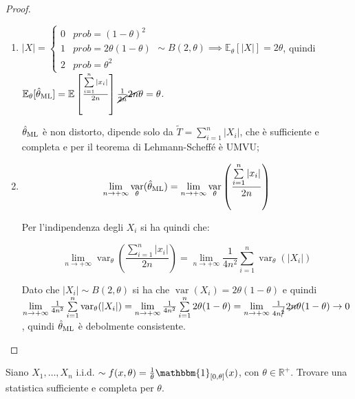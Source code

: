 \documentclass[hidelinks, 10pt]{report}
\DeclareMathOperator{\var}{var}
\begin{document}
\begin{proof}
\begin{enumerate}
Impostato uguale a zero, si ha che $ \ML{\theta} = \frac{\sum\limits_{i = 1}^{n} \vert x_{i} \vert}{2 n} $. \`E un massimo? Si pu\`o derivare un'altra volta oppure guardando il segno del numeratore della derivata prima, che \`e positivo se $ \theta < \ML{\theta} $, quindi $ \ML{\theta} $ \`e un massimo;
\item $ \vert X \vert = \begin{cases} 0 & prob = (1 - \theta)^{2} \\ 1 & prob = 2 \theta(1 - \theta) \\ 2 & prob = \theta^{2} \end{cases} \sim B(2, \theta) \implies \mathbb{E}_{\theta} [\vert X \vert] = 2 \theta $, quindi $ \mathbb{E}_{\theta} [\hat{\theta}_{\text{ML}}] = \mathbb{E} \left[ \frac{\sum\limits_{i = 1}^{n} \vert x_{i} \vert}{2n} \right] \frac{1}{\cancel{2n}} \cancel{2n} \theta = \theta $.

$ \ML{\theta} $ \`e non distorto, dipende solo da $ \tilde{T} = \sum\limits_{i = 1}^{n} \vert X_{i} \vert $, che \`e sufficiente e completa e per il teorema di Lehmann-Scheff\'e \`e UMVU;
\item \[ \lim_{n \to +\infty} \var_{\theta} (\ML{\theta}) = \lim_{n \to +\infty} \var_{\theta} \left( \frac{\sum\limits_{i = 1}^{n} \vert x_{i} \vert}{2n} \right) \]

Per l'indipendenza degli $ X_{i} $ si ha quindi che:

\[ \lim_{n \to +\infty} \var_{\theta} \left( \frac{\sum\limits_{i = 1}^{n} \vert x_{i} \vert}{2n} \right) = \lim_{n \to +\infty} \frac{1}{4 n^{2}} \sum\limits_{i = 1}^{n} \var_{\theta} (\vert X_{i} \vert) \]

Dato che $ \vert X_{i} \vert \sim B(2, \theta) $ si ha che $ \var (X_{i}) = 2 \theta(1 - \theta) $ e quindi $ \lim\limits_{n \to +\infty} \frac{1}{4 n^{2}} \sum\limits_{i = 1}^{n} \var_{\theta} (\vert X_{i} \vert) = \lim\limits_{n \to +\infty} \frac{1}{4 n^{2}} \sum\limits_{i = 1}^{n} 2 \theta (1 - \theta) = \lim\limits_{n \to +\infty} \frac{1}{4 n^{\cancel{2}}} 2 \cancel{n} \theta (1 - \theta) \to 0 $, quindi $ \ML{\theta} $ \`e debolmente consistente.
\end{enumerate}
\end{proof}

\begin{ex}
Siano $ X_{1}, \dotsc, X_{n} $ i.i.d. $ \sim f(x, \theta) = \frac{1}{\theta} \mathbbm{1}_{[0, \theta]} (x) $, con $ \theta \in \mathbb{R}^{+} $. Trovare una statistica sufficiente e completa per $ \theta $.
\end{ex}
\end{document}
